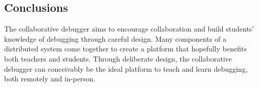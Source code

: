 \documentclass[12pt]{article}
\begin{document}
\subsection{Conclusions}

The collaborative debugger aims to encourage collaboration and build
students' knowledge of debugging through careful design.  Many
components of a distributed system come together to create a platform
that hopefully benefits both teachers and students.  Through
deliberate design, the collaborative debugger can conceivably be the
ideal platform to teach and learn debugging, both remotely and
in-person.

\pagebreak

{}
\end{document}
